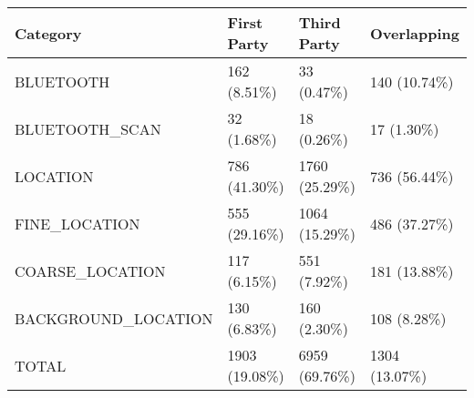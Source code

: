 \begin{tabular}{llll}
\toprule
           Category &   First Party &   Third Party &   Overlapping \\
\midrule
          BLUETOOTH &   162 (8.51\%) &    33 (0.47\%) &  140 (10.74\%) \\
     BLUETOOTH_SCAN &    32 (1.68\%) &    18 (0.26\%) &    17 (1.30\%) \\
           LOCATION &  786 (41.30\%) & 1760 (25.29\%) &  736 (56.44\%) \\
      FINE_LOCATION &  555 (29.16\%) & 1064 (15.29\%) &  486 (37.27\%) \\
    COARSE_LOCATION &   117 (6.15\%) &   551 (7.92\%) &  181 (13.88\%) \\
BACKGROUND_LOCATION &   130 (6.83\%) &   160 (2.30\%) &   108 (8.28\%) \\
              TOTAL & 1903 (19.08\%) & 6959 (69.76\%) & 1304 (13.07\%) \\
\bottomrule
\end{tabular}
